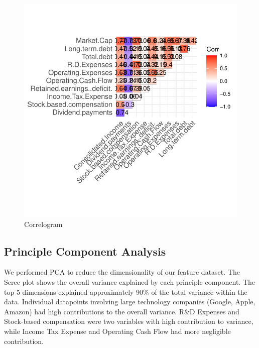 \documentclass[11pt,]{article}
\begin{document}
\begin{figure}

{\centering \includegraphics{stock_analysis_files/figure-latex/corrplot 2-1} 

}

\caption{Correlogram\label{sec:fig3}}\label{fig:corrplot 2}
\end{figure}

\hypertarget{principle-component-analysis-1}{%
\subsection{Principle Component
Analysis}\label{principle-component-analysis-1}}

We performed PCA to reduce the dimensionality of our feature dataset.
The Scree plot shows the overall variance explained by each principle
component. The top 5 dimensions explained approximately 90\% of the
total variance within the data. Individual datapoints involving large
technology companies (Google, Apple, Amazon) had high contributions to
the overall variance. R\&D Expenses and Stock-based compensation were
two variables with high contribution to variance, while Income Tax
Expense and Operating Cash Flow had more negligible contribution.
\end{document}
